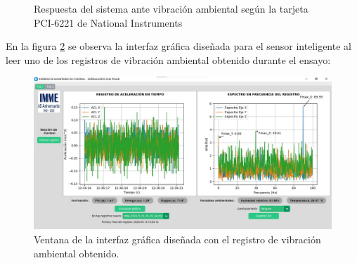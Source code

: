 \begin{figure}[H]
    \centering
    \hfill
    \caption{Respuesta del sistema ante vibración ambiental según la tarjeta PCI-6221 de National Instruments}
    \label{fig:DAQAmb}
\end{figure}

En la figura \ref{fig:ambientalGUI} se observa la interfaz gráfica diseñada para el sensor inteligente al leer uno de los registros de vibración ambiental obtenido durante el ensayo:

\begin{figure}[H]
    \centering
    \includegraphics[width = \textwidth]{imagenes/cap3_resultados/Ensayos/VibAmb2SmartSensorGUI.jpg}
    \caption{Ventana de la interfaz gráfica diseñada con el registro de vibración ambiental obtenido.}
    \label{fig:ambientalGUI}
\end{figure}

